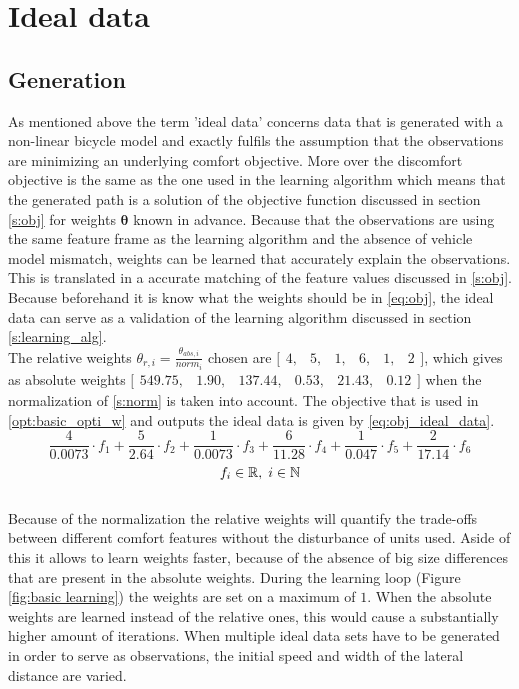 \section{Ideal data} \label{s:GD}
\subsection{Generation}
As mentioned above the term 'ideal data' concerns data that is generated with a non-linear bicycle model and exactly fulfils the assumption that the observations are minimizing an underlying comfort objective. More over the discomfort objective is the same as the one used in the learning algorithm which means that the generated path is a solution of the objective function discussed in section \ref{s:obj} for weights $\bm{\theta}$ known in advance. Because that the observations are using the same feature frame as the learning algorithm and the absence of vehicle model mismatch, weights can be learned that accurately explain the observations. This is translated in a accurate matching of the feature values discussed in \ref{s:obj}. Because beforehand it is know what the weights should be in \ref{eq:obj}, the ideal data can serve as a validation of the learning algorithm discussed in section \ref{s:learning_alg}.\\


The relative weights $\theta_{r,i} = \frac{\theta_{abs,i}}{norm_i}$ chosen are $ \bigl[ \begin{smallmatrix} 4,&5,&1,&6,&1,&2\end{smallmatrix}\bigr]$, which gives as absolute weights  $ \bigl[ \begin{smallmatrix} 549.75, &1.90, &137.44  ,&0.53,  &21.43, &0.12\end{smallmatrix}\bigr]$ when the normalization of \ref{s:norm} is taken into account. The objective that is used in \ref{opt:basic_opti_w} and outputs the ideal data is given by \ref{eq:obj_ideal_data}. 
\begin{equation}\label{eq:obj_ideal_data}
\frac{4}{0.0073} \cdot f_1 +\frac{5}{2.64} \cdot f_2 +\frac{1}{0.0073} \cdot f_3 +\frac{6}{11.28} \cdot f_4 +\frac{1}{0.047} \cdot f_5 +\frac{2}{17.14} \cdot f_6 
\end{equation}
\[	f_i \in \mathbb{R}, \hspace{1mm}
i \in \mathbb{N}\]\\

Because of the normalization the relative weights will quantify the trade-offs between different comfort features without the disturbance of units used. Aside of this it allows to learn weights faster, because of the absence of big size differences that are present in the absolute weights. During the learning loop (Figure \ref{fig:basic learning}) the weights are set on a maximum of $1$. When the absolute weights are learned instead of the relative ones, this would cause a substantially higher amount of iterations.  When multiple ideal data sets have to be generated in order to serve as observations, the initial speed and width of the lateral distance are varied.\\

